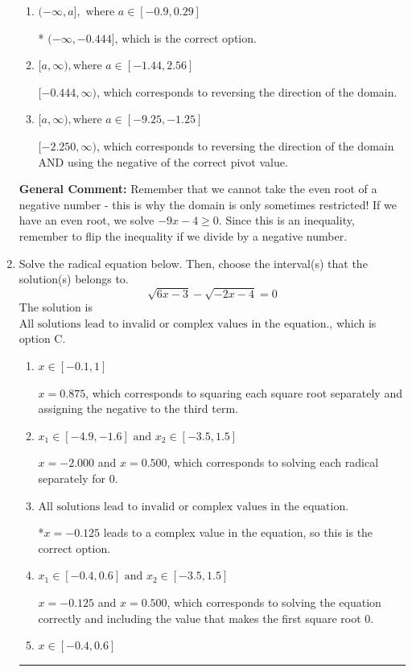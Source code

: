 \documentclass{extbook}[14pt]
\newcommand{\litem}[1]{\item #1

\rule{\textwidth}{0.4pt}}
\begin{document}
\begin{enumerate}
{\begin{enumerate}[label=\Alph*.]
This corresponds to the radical having an odd power, but the radical for this question is even.
\item \( (-\infty, a], \text{ where } a \in [-0.9, 0.29] \)

* $(-\infty, -0.444]$, which is the correct option.
\item \( [a, \infty), \text{where } a \in [-1.44, 2.56] \)

 $[-0.444, \infty)$, which corresponds to reversing the direction of the domain.
\item \( [a, \infty), \text{where } a \in [-9.25, -1.25] \)

$[-2.250, \infty)$, which corresponds to reversing the direction of the domain AND using the negative of the correct pivot value.
\end{enumerate}

\textbf{General Comment:} Remember that we cannot take the even root of a negative number - this is why the domain is only sometimes restricted! If we have an even root, we solve $-9 x - 4 \geq 0$. Since this is an inequality, remember to flip the inequality if we divide by a negative number.
}
\litem{
Solve the radical equation below. Then, choose the interval(s) that the solution(s) belongs to.
\[ \sqrt{6 x - 3} - \sqrt{-2 x - 4} = 0 \]The solution is \( \text{All solutions lead to invalid or complex values in the equation.} \), which is option C.\begin{enumerate}[label=\Alph*.]
\item \( x \in [-0.1,1] \)

$x = 0.875$, which corresponds to squaring each square root separately and assigning the negative to the third term.
\item \( x_1 \in [-4.9, -1.6] \text{ and } x_2 \in [-3.5,1.5] \)

$x = -2.000$ and $x = 0.500$, which corresponds to solving each radical separately for 0.
\item \( \text{All solutions lead to invalid or complex values in the equation.} \)

*$x = -0.125$ leads to a complex value in the equation, so this is the correct option.
\item \( x_1 \in [-0.4, 0.6] \text{ and } x_2 \in [-3.5,1.5] \)

$x = -0.125$ and $x = 0.500$, which corresponds to solving the equation correctly and including the value that makes the first square root 0.
\item \( x \in [-0.4,0.6] \)


\end{enumerate}}
\end{enumerate}
\end{document}
